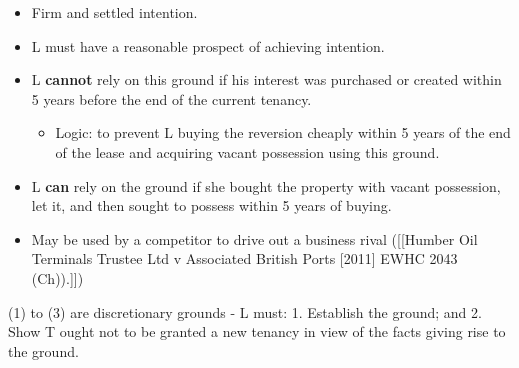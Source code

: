 \documentclass[
]{article}
\newenvironment{Shaded}{}{}
\newcommand{\NormalTok}[1]{#1}
\providecommand{\tightlist}{%
  \setlength{\itemsep}{0pt}\setlength{\parskip}{0pt}}
\begin{document}
\begin{itemize}
  \begin{itemize}
  \tightlist
  \item
    Firm and settled intention.
  \item
    L must have a reasonable prospect of achieving intention.
  \item
    L \textbf{cannot} rely on this ground if his interest was purchased
    or created within 5 years before the end of the current tenancy.

    \begin{itemize}
    \tightlist
    \item
      Logic: to prevent L buying the reversion cheaply within 5 years of
      the end of the lease and acquiring vacant possession using this
      ground.
    \end{itemize}
  \item
    L \textbf{can} rely on the ground if she bought the property with
    vacant possession, let it, and then sought to possess within 5 years
    of buying.
  \item
    May be used by a competitor to drive out a business rival
    ({[}{[}Humber Oil Terminals Trustee Ltd v Associated British Ports
    {[}2011{]} EWHC 2043 (Ch)).{]}{]})
  \end{itemize}
\end{itemize}

\begin{Shaded}
\begin{Highlighting}[]
\NormalTok{(1) to (3) are discretionary grounds {-} L must:}
\NormalTok{1. Establish the ground; and}
\NormalTok{2. Show T ought not to be granted a new tenancy in view of the facts giving rise to the ground. }
\end{Highlighting}
\end{Shaded}
\end{document}

